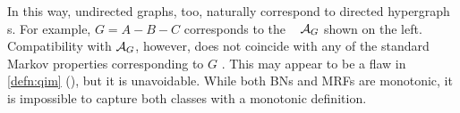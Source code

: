 In this way, undirected graphs, too, naturally correspond to directed hypergraph s.
For example, 
$G = A{-}B{-}C$
corresponds to the \hgraph\ 
\commentout{
\[
    \Ar_{G} = \Bigg\{
            \begin{array}{r@{}l} \{B\}&{\to}\{A\},\\ \{A,C\}&{\to}\{B\},\\ \{B\}&{\to}\{C\}
            \end{array}\Bigg\}
    =     \begin{tikzpicture}[center base]
        \node[dpad1] (A) at (-0.6,0) {$A$};
        \node[dpad1] (B) at (0,1) {$B$};
        \node[dpad1] (C) at (0.6,0) {$C$};

        \draw[arr2,<-] (A) -- (B);
        \draw[arr2,<-] (C) -- (B);
        \mergearr[arr2] ACB
    \end{tikzpicture}
    ~.
\]
}
$\mathcal A_G$ shown on the left.
% 
Compatibility
with $\mathcal A_G$, however, does not coincide with any of the standard Markov properties
corresponding to $G$
    \citep{lauritzen-mrf-indeps}.
%
This may appear to be a flaw in \cref{defn:qim} (\scibility), but it is unavoidable.  
While both BNs and MRFs are monotonic, it is impossible to capture both classes with a monotonic definition.

